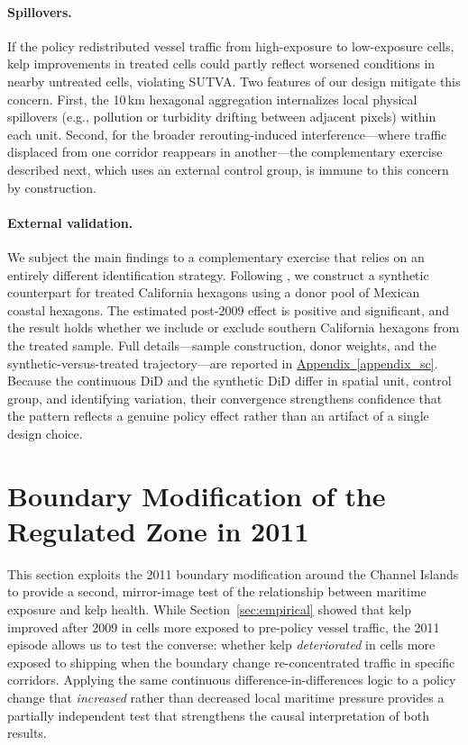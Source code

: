 \documentclass[12pt]{article}
\begin{document}
\paragraph{Spillovers.} If the policy redistributed vessel traffic from high-exposure to low-exposure cells, kelp improvements in treated cells could partly reflect worsened conditions in nearby untreated cells, violating SUTVA. Two features of our design mitigate this concern. First, the 10\,km hexagonal aggregation internalizes local physical spillovers (e.g., pollution or turbidity drifting between adjacent pixels) within each unit. Second, for the broader rerouting-induced interference---where traffic displaced from one corridor reappears in another---the complementary exercise described next, which uses an external control group, is immune to this concern by construction.

\paragraph{External validation.} We subject the main findings to a complementary exercise that relies on an entirely different identification strategy. Following \citet{Arkhangelsky2021}, we construct a synthetic counterpart for treated California hexagons using a donor pool of Mexican coastal hexagons. The estimated post-2009 effect is positive and significant, and the result holds whether we include or exclude southern California hexagons from the treated sample. Full details---sample construction, donor weights, and the synthetic-versus-treated trajectory---are reported in \hyperref[appendix_sc]{Appendix~\ref*{appendix_sc}}. Because the continuous DiD and the synthetic DiD differ in spatial unit, control group, and identifying variation, their convergence strengthens confidence that the pattern reflects a genuine policy effect rather than an artifact of a single design choice.

\section{Boundary Modification of the Regulated Zone in 2011}
\label{sec:extension2011}

This section exploits the 2011 boundary modification around the Channel Islands to provide a second, mirror-image test of the relationship between maritime exposure and kelp health. While Section~\ref{sec:empirical} showed that kelp improved after 2009 in cells more exposed to pre-policy vessel traffic, the 2011 episode allows us to test the converse: whether kelp \emph{deteriorated} in cells more exposed to shipping when the boundary change re-concentrated traffic in specific corridors. Applying the same continuous difference-in-differences logic to a policy change that \emph{increased} rather than decreased local maritime pressure provides a partially independent test that strengthens the causal interpretation of both results.
\end{document}
